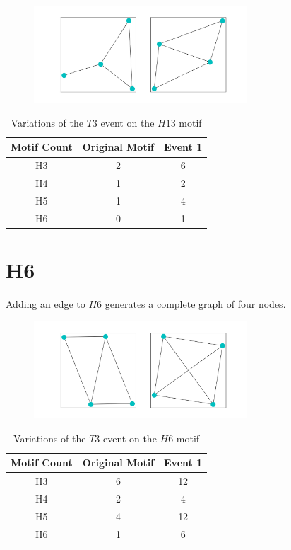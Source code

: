 \begin{figure}[!ht]
    \includegraphics[width=8cm]{Images/H5_T3_evolution.png}
    \centering
\end{figure}

\begin{table}
    \centering
    \begin{tabular}{||c c c||} 
    \hline
    Motif Count & Original Motif & Event 1 \\ [0.5ex] 
    \hline\hline
    H3 & 2 & 6\\ 
    \hline
    H4 & 1 & 2 \\
    \hline
    H5 & 1 & 4\\
    \hline
    H6 & 0 & 1\\
    \hline
   \end{tabular}
   \caption{Variations of the $T3$ event on the $H13$ motif}
   \label{table:14}
\end{table}

\section{H6}
Adding an edge to $H6$ generates a complete graph of four nodes. 

\begin{figure}[!ht]
    \includegraphics[width=8cm]{Images/H6_T3_evolution.png}
    \centering
\end{figure}

\begin{table}
    \centering
    \begin{tabular}{||c c c ||} 
    \hline
    Motif Count & Original Motif & Event 1  \\ [0.5ex] 
    \hline\hline
    H3 & 6 & 12 \\ 
    \hline
    H4 & 2 & 4 \\
    \hline
    H5 & 4 & 12 \\
    \hline
    H6 & 1 & 6 \\
    \hline
    \hline
   \end{tabular}
   \caption{Variations of the $T3$ event on the $H6$ motif}
   \label{table:15}
\end{table}

